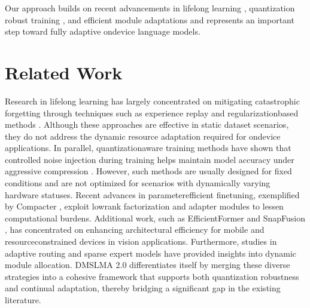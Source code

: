 \documentclass{article} %
\begin{document}
Our approach builds on recent advancements in lifelong learning \cite{sun2019lamol, chaudhry2018lifelong}, quantization robust training \cite{fan2020training}, and efficient module adaptations \cite{mahabadi2021compacter} and represents an important step toward fully adaptive on\-device language models.

\section{Related Work}
\label{sec:related}
Research in lifelong learning has largely concentrated on mitigating catastrophic forgetting through techniques such as experience replay and regularization\-based methods \cite{sun2019lamol, chaudhry2018lifelong}. Although these approaches are effective in static dataset scenarios, they do not address the dynamic resource adaptation required for on\-device applications. In parallel, quantization\-aware training methods have shown that controlled noise injection during training helps maintain model accuracy under aggressive compression \cite{fan2020training}. However, such methods are usually designed for fixed conditions and are not optimized for scenarios with dynamically varying hardware statuses. Recent advances in parameter\-efficient fine\-tuning, exemplified by Compacter \cite{mahabadi2021compacter}, exploit low\-rank factorization and adapter modules to lessen computational burdens. Additional work, such as EfficientFormer \cite{li2022efficientformer} and SnapFusion \cite{li2023snapfusion}, has concentrated on enhancing architectural efficiency for mobile and resource\-constrained devices in vision applications. Furthermore, studies in adaptive routing and sparse expert models \cite{zhang2022examining, lewis2021base} have provided insights into dynamic module allocation. DMS\-LMA 2.0 differentiates itself by merging these diverse strategies into a cohesive framework that supports both quantization robustness and continual adaptation, thereby bridging a significant gap in the existing literature.
\end{document}
